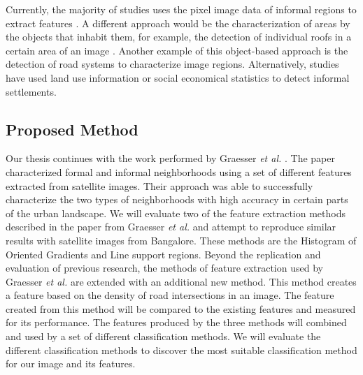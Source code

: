 Currently, the majority of studies uses the pixel image data of informal regions to extract features \cite{kuffer2016slums}. A different approach would be the characterization of areas by the objects that inhabit them, for example, the detection of individual roofs in a certain area of an image \cite{williams2016automatic}. Another example of this object-based approach is the detection of road systems to characterize image regions. Alternatively, studies have used land use information \cite{novack2010urban} or social economical statistics \cite{engstrom2011using} to detect informal settlements.



 
\subsection{Proposed Method}

Our thesis continues with the work performed by Graesser \textit{et al.} \cite{graesser2012image}. The paper characterized formal and informal neighborhoods using a set of different features extracted from satellite images. Their approach was able to successfully characterize the two types of neighborhoods with high accuracy in certain parts of the urban landscape. We will evaluate two of the feature extraction methods described in the paper from Graesser \textit{et al.} and attempt to reproduce similar results with satellite images from Bangalore. These methods are the Histogram of Oriented Gradients and Line support regions. Beyond the replication and evaluation of previous research, the methods of feature extraction used by Graesser \textit{et al.} are extended with an additional new method. This method creates a feature based on the density of road intersections in an image. The feature created from this method will be compared to the existing features and measured for its performance. The features produced by the three methods will combined and used by a set of different classification methods. We will evaluate the different classification methods to discover the most suitable classification method for our image and its features. 

